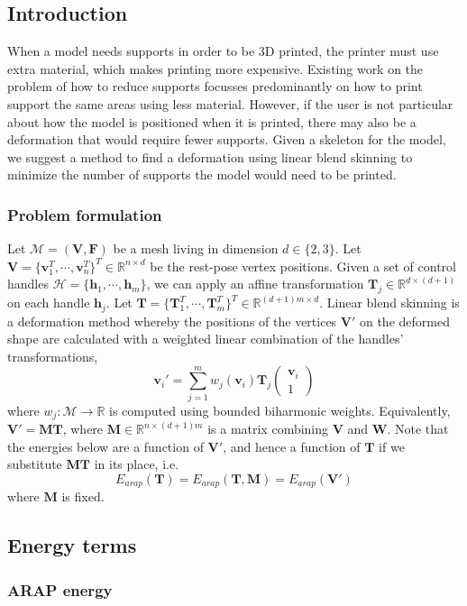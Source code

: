 \documentclass[12pt]{article}
\newcommand{\R}{\mathbb{R}}
\newcommand{\calM}{\mathcal{M}}
\newcommand{\calH}{\mathcal{H}}
\newcommand{\bV}{\mathbf{V}}
\newcommand{\bF}{\mathbf{F}}
\newcommand{\bW}{\mathbf{W}}
\newcommand{\bM}{\mathbf{M}}
\newcommand{\bT}{\mathbf{T}}
\newcommand{\bv}{\mathbf{v}}
\newcommand{\bh}{\mathbf{h}}
\begin{document}
\begin{multicols}{2}

\subsection*{Introduction}
When a model needs supports in order to be 3D printed, the printer must use extra material, which makes printing more expensive. Existing work on the problem of how to reduce supports focusses predominantly on how to print support the same areas using less material. However, if the user is not particular about how the model is positioned when it is printed, there may also be a deformation that would require fewer supports. Given a skeleton for the model, we suggest a method to find a deformation using linear blend skinning to minimize the number of supports the model would need to be printed.

\subsubsection*{Problem formulation}
Let $\calM = (\bV, \bF)$ be a mesh living in dimension $d\in \{2,3\}$. Let $\bV = \{\bv_1^T, \cdots, \bv_n^T\}^T \in \R^{n \times d}$ be the rest-pose vertex positions. Given a set of control handles $\calH = \{ \bh_1, \cdots, \bh_m \}$, we can apply an affine transformation $\bT_j \in \R^{d \times (d+1)}$ on each handle $\bh_j$. Let $\bT = \{ \bT_1^T, \cdots, \bT_m^T \}^T \in \R^{(d+1)m \times d}$. Linear blend skinning is a deformation method whereby the positions of the vertices $\bV'$ on the deformed shape are calculated with a weighted linear combination of the handles' transformations,
\[
    \bv_i' = \sum_{j=1}^m w_j(\bv_i) \bT_j 
    \begin{pmatrix} 
    \bv_i \\
    1
    \end{pmatrix} 
\]
where $w_j: \calM \rightarrow \R$ is computed using bounded biharmonic weights. Equivalently, $\bV' = \bM \bT$, where $\bM \in \R^{n \times (d+1)m}$ is a matrix combining $\bV$ and $\bW$. Note that the energies below are a function of $\bV'$, and hence a function of $\bT$ if we substitute $\bM \bT$ in its place, i.e. 
\[
    E_{arap}(\bT) = E_{arap}(\bT, \bM) = E_{arap}(\bV')
\]
where $\bM$ is fixed.

\subsection*{Energy terms}
\subsubsection*{ARAP energy}


\end{multicols}
\end{document}
